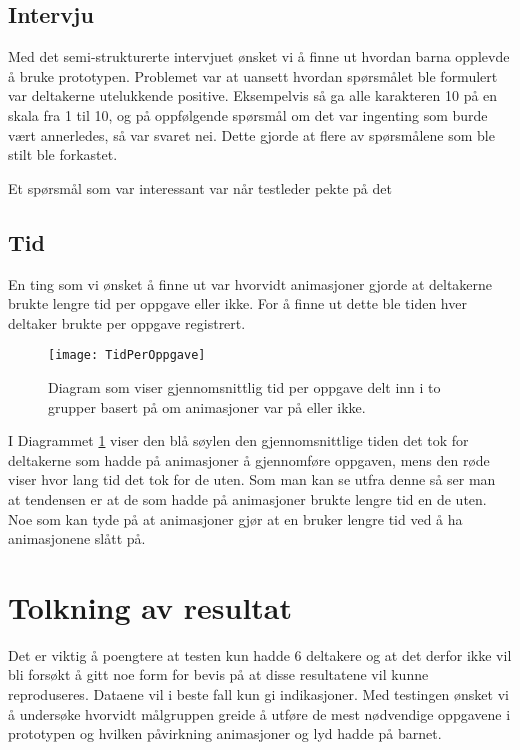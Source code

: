 \subsection{Intervju} 
 
Med det semi-strukturerte intervjuet ønsket vi å finne ut hvordan barna opplevde å bruke prototypen. Problemet var at uansett hvordan spørsmålet ble formulert var deltakerne utelukkende positive. Eksempelvis så ga alle karakteren 10 på en skala fra 1 til 10, og på oppfølgende spørsmål om det var ingenting som burde vært annerledes, så var svaret nei. Dette gjorde at flere av spørsmålene som ble stilt ble forkastet.  
 
Et spørsmål som var interessant var når testleder pekte på det 
 
 
\subsection{Tid} 
 
 
En ting som vi ønsket å finne ut var hvorvidt animasjoner gjorde at deltakerne brukte lengre tid per oppgave eller ikke. For å finne ut dette ble tiden hver deltaker brukte per oppgave registrert.  
 
 
\begin{figure}[ht!] 
\centering 
\texttt{[image: TidPerOppgave]} 
\caption{Diagram som viser gjennomsnittlig tid per oppgave delt inn i to grupper basert på om animasjoner var på eller ikke.} 
\label{fig:DiagramTidPerOppgave} 
\end{figure} 
 
 
I Diagrammet \ref{fig:DiagramTidPerOppgave} viser den blå søylen den gjennomsnittlige tiden det tok for deltakerne som hadde på animasjoner å gjennomføre oppgaven, mens den røde viser hvor lang tid det tok for de uten. Som man kan se utfra denne så ser man at tendensen er at de som hadde på animasjoner brukte lengre tid en de uten. Noe som kan tyde på at animasjoner gjør at en bruker lengre tid ved å ha animasjonene slått på.  
 
 
 
\section{Tolkning av resultat} 
 
 
Det er viktig å poengtere at testen kun hadde 6 deltakere og at det derfor ikke vil bli forsøkt å gitt noe form for bevis på at disse resultatene vil kunne reproduseres. Dataene vil i beste fall kun gi indikasjoner.  Med testingen ønsket vi å undersøke hvorvidt målgruppen greide å utføre de mest nødvendige oppgavene i prototypen og hvilken påvirkning animasjoner og lyd hadde på barnet.  
 
